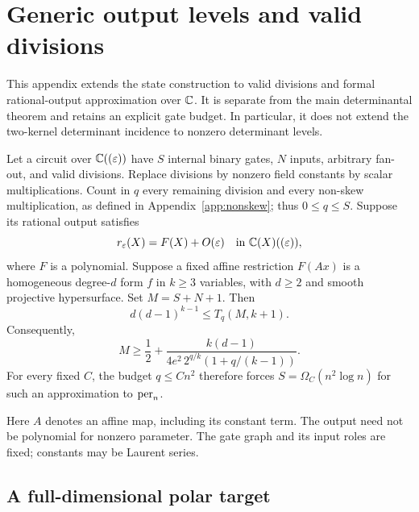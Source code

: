 \section{Generic output levels and valid divisions}\label{app:rationalstate}

This appendix extends the state construction to valid divisions and
formal rational-output approximation over $\mathbb C$. It is separate from the
main determinantal theorem and retains an explicit gate budget. In
particular, it does not extend the two-kernel determinant incidence to
nonzero determinant levels.

\begin{theorem}\label{thm:rationalstate}
Let a circuit over $\mathbb C((\varepsilon))$ have $S$ internal binary gates,
$N$ inputs, arbitrary fan-out, and valid divisions. Replace divisions
by nonzero field constants by scalar multiplications. Count in $q$
every remaining division and every non-skew multiplication, as defined
in Appendix~\ref{app:nonskew}; thus $0\le q\le S$. Suppose its rational
output satisfies
\[
 r_\varepsilon(X)=F(X)+O(\varepsilon)
 \quad\hbox{in }\mathbb C(X)((\varepsilon)),
\]
where $F$ is a polynomial. Suppose a fixed affine restriction $F(Ax)$
is a homogeneous degree-$d$ form $f$ in $k\ge3$ variables, with $d\ge2$
and smooth projective hypersurface. Set $M=S+N+1$. Then
\begin{equation}\label{eq:rationalstate}
 d(d-1)^{k-1}\le T_q(M,k+1).
\end{equation}
Consequently,
\begin{equation}\label{eq:rationaltradeoff}
 M\ge\frac12+
 \frac{k(d-1)}{4e^2\,2^{q/k}(1+q/(k-1))}.
\end{equation}
For every fixed $C$, the budget $q\le Cn^2$ therefore forces
$S=\Omega_C(n^2\log n)$ for such an approximation to $\operatorname{per}_n$.
\end{theorem}

Here $A$ denotes an affine map, including its constant term. The
output need not be polynomial for nonzero parameter. The gate graph
and its input roles are fixed; constants may be Laurent series.

\subsection*{A full-dimensional polar target}

